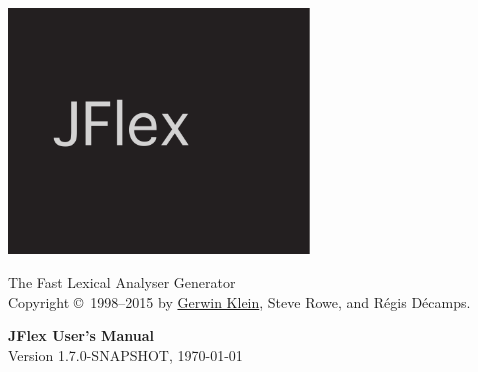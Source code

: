 \documentclass[11pt]{scrartcl}
\begin{document}
\centerline{\includegraphics[width=0.6\textwidth]{jflex-black}}

\begin{center}
\sffamily
{\Large The Fast Lexical Analyser Generator}\\
\smallskip\smallskip
Copyright \copyright\ 1998--2015 by \href{http://www.doclsf.de}{Gerwin Klein},
Steve Rowe, and R\'egis D\'ecamps.

\vspace*{15ex}
{\Huge \sffamily \bfseries JFlex User's Manual}\\
\bigskip
Version 1.7.0-SNAPSHOT, {\today}
\end{center}

\newpage
\tableofcontents
\newpage










\newpage  



\end{document}
